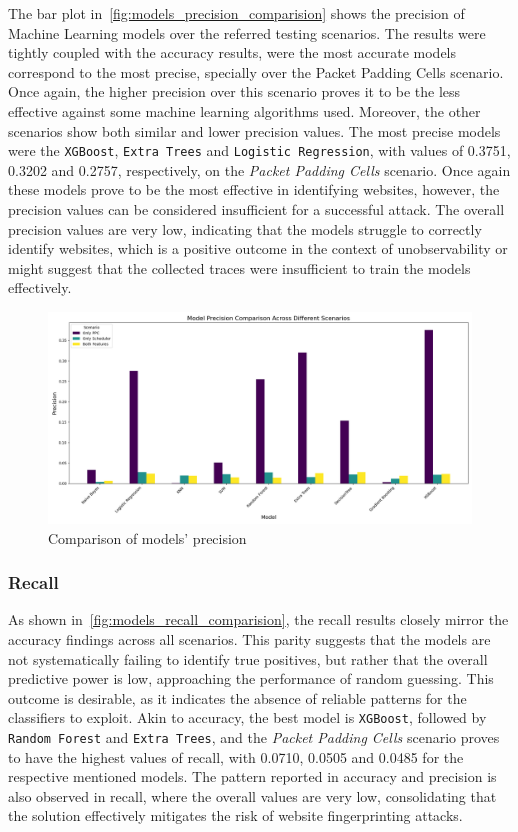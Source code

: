 The bar plot in~\autoref{fig:models_precision_comparision} shows the precision of Machine Learning models over the referred testing scenarios. The results were tightly coupled with the accuracy results, were the most accurate models correspond to the most precise, specially over the Packet Padding Cells scenario. Once again, the higher precision over this scenario proves it to be the less effective against some machine learning algorithms used. Moreover, the other scenarios show both similar and lower precision values. 
The most precise models were the \texttt{XGBoost}, \texttt{Extra Trees} and \texttt{Logistic Regression}, with values of 0.3751, 0.3202 and 0.2757, respectively, on the \textit{Packet Padding Cells} scenario. Once again these models prove to be the most effective in identifying websites, however, the precision values can be considered insufficient for a successful attack. The overall precision values are very low, indicating that the models struggle to correctly identify websites, which is a positive outcome in the context of unobservability or might suggest that the collected traces were insufficient to train the models effectively.
\begin{figure}[!h]
  \centering
  \includegraphics[width=\textwidth]{Chapters/Figures/Plots/obs-no-control/obs_Precision_comparison.png}
  \caption{Comparison of models' precision}\label{fig:models_precision_comparision}
\end{figure}
\FloatBarrier

\subsubsection{Recall}

As shown in~\autoref{fig:models_recall_comparision}, the recall results closely mirror the accuracy findings across all scenarios. This parity suggests that the models are not systematically failing to identify true positives, but rather that the overall predictive power is low, approaching the performance of random guessing. This outcome is desirable, as it indicates the absence of reliable patterns for the classifiers to exploit. Akin to accuracy, the best model is \texttt{XGBoost}, followed by \texttt{Random Forest} and \texttt{Extra Trees}, and the \textit{Packet Padding Cells} scenario proves to have the highest values of recall, with 0.0710, 0.0505 and 0.0485 for the respective mentioned models. The pattern reported in accuracy and precision is also observed in recall, where the overall values are very low, consolidating that the solution effectively mitigates the risk of website fingerprinting attacks.


